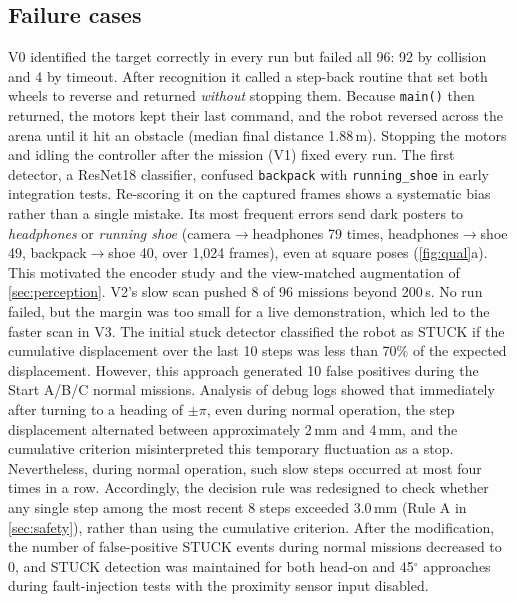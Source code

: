 \subsection{Failure cases}
V0 identified the target correctly in every run but failed all 96: 92 by collision and 4 by timeout. After recognition it called a step-back routine that set both wheels to reverse and returned \emph{without} stopping them. Because \texttt{main()} then returned, the motors kept their last command, and the robot reversed across the arena until it hit an obstacle (median final distance 1.88\,m). Stopping the motors and idling the controller after the mission (V1) fixed every run.
The first detector, a ResNet18 classifier, confused \texttt{backpack} with \texttt{running\_shoe} in early integration tests. Re-scoring it on the captured frames shows a systematic bias rather than a single mistake. Its most frequent errors send dark posters to \emph{headphones} or \emph{running shoe} (camera$\to$headphones 79 times, headphones$\to$shoe 49, backpack$\to$shoe 40, over 1{,}024 frames), even at square poses (\cref{fig:qual}a). This motivated the encoder study and the view-matched augmentation of \cref{sec:perception}.
V2's slow scan pushed 8 of 96 missions beyond 200\,s. No run failed, but the margin was too small for a live demonstration, which led to the faster scan in V3.
The initial stuck detector classified the robot as STUCK if the cumulative displacement over the last 10 steps was less than 70\% of the expected displacement. 
However, this approach generated 10 false positives during the Start A/B/C normal missions. 
Analysis of debug logs showed that immediately after turning to a heading of $\pm\pi$, even during normal operation, the step displacement alternated between approximately 2\,mm and 4\,mm, and the cumulative criterion misinterpreted this temporary fluctuation as a stop. 
Nevertheless, during normal operation, such slow steps occurred at most four times in a row.
Accordingly, the decision rule was redesigned to check whether any single step among the most recent 8 steps exceeded 3.0\,mm (Rule A in \cref{sec:safety}), rather than using the cumulative criterion.
After the modification, the number of false-positive STUCK events during normal missions decreased to 0, and STUCK detection was maintained for both head-on and 45$^\circ$ approaches during fault-injection tests with the proximity sensor input disabled.

